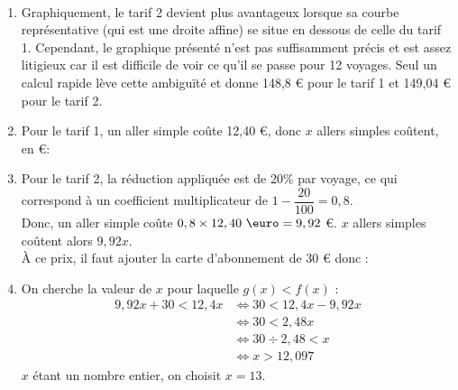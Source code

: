 \ \\ [-5mm]
   \begin{enumerate}
      \item Graphiquement, le tarif 2 devient plus avantageux lorsque sa courbe représentative (qui est une droite affine) se situe en dessous de celle du tarif 1. Cependant, le graphique présenté n'est pas suffisamment précis et est assez litigieux car il est difficile de voir ce qu'il se passe pour 12 voyages. Seul un calcul rapide lève cette ambiguïté et donne 148,8 \euro{} pour le tarif 1 et 149,04 \euro{} pour le tarif 2. \\
         \item Pour le tarif 1, un aller simple coûte 12,40 \euro, donc $x$ allers simples coûtent, en \euro : 
         \item Pour le tarif 2, la réduction appliquée est de 20\% par voyage, ce qui correspond à un coefficient multiplicateur de $1-\dfrac{20}{100} =0,8$. \\
         Donc, un aller simple coûte $0,8\times12,40\text{ \euro} =9,92$ \euro. $x$ allers simples coûtent alors $9,92x$. \\
         À ce prix, il faut ajouter la carte d'abonnement de 30 \euro{} donc : 
      \item On cherche la valeur de $x$ pour laquelle $g(x)<f(x)$ :
         \begin{align*}
         9,92x+30<12,4x & \iff 30<12,4x-9,92x \\
         & \iff 30<2,48x \\
         & \iff 30\div2,48<x \\
         & \iff x>12,097
         \end{align*}
         $x$ étant un nombre entier, on choisit $x =13$. 
      \end{enumerate}
